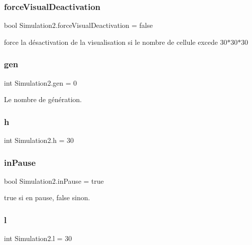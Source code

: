 \subsubsection{\texorpdfstring{force\+Visual\+Deactivation}{forceVisualDeactivation}}
{\footnotesize\ttfamily bool Simulation2.\+force\+Visual\+Deactivation = false}



force la désactivation de la visualisation si le nombre de cellule excede 30$\ast$30$\ast$30 

\mbox{\label{class_simulation2_ac69e02052c567c7f3b27cdbb141fd8ee}} 
\subsubsection{\texorpdfstring{gen}{gen}}
{\footnotesize\ttfamily int Simulation2.\+gen = 0}



Le nombre de génération. 

\mbox{\label{class_simulation2_af29275bd4a0258f40145571332bcbfe7}} 
\subsubsection{\texorpdfstring{h}{h}}
{\footnotesize\ttfamily int Simulation2.\+h = 30}

\mbox{\label{class_simulation2_ae39c9077019822d56529bafcba2727c1}} 
\subsubsection{\texorpdfstring{in\+Pause}{inPause}}
{\footnotesize\ttfamily bool Simulation2.\+in\+Pause = true}



true si en pause, false sinon. 

\mbox{\label{class_simulation2_a3c066b4b23080953fcce80b1fc2c56b4}} 
\subsubsection{\texorpdfstring{l}{l}}
{\footnotesize\ttfamily int Simulation2.\+l = 30}

